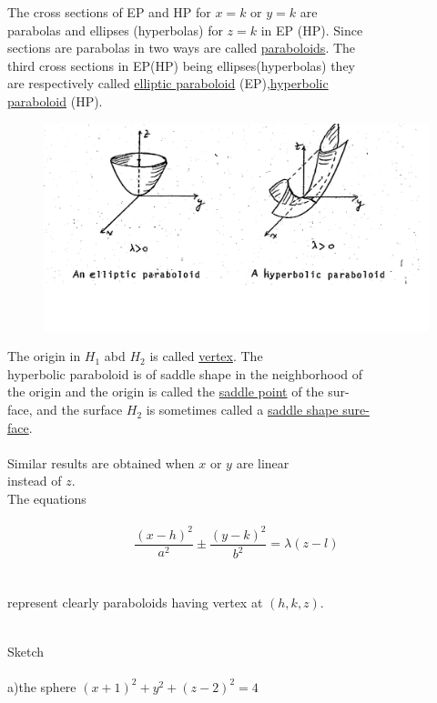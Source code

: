 \documentclass[a4paper,11pt]{amsbook}
\begin{document}
The cross sections of EP and HP for $x=k$ or $y=k$ are\\
parabolas and ellipses (hyperbolas) for $z=k$ in EP (HP). Since\\
sections are parabolas in two ways are called \underline{paraboloids}. The\\
third cross sections in EP(HP) being ellipses(hyperbolas) they\\
are respectively called \underline{elliptic paraboloid} (EP),\underline{hyperbolic} \\
\underline{paraboloid} (HP).
\\

\begin{figure}[h]
\includegraphics [keepaspectratio=true,scale=0.35]{images/p212-fig1}

\end{figure}

The origin in $H_{1}$ abd $H_{2}$ is called \underline{vertex}. The\\
hyperbolic paraboloid is of saddle shape in the neighborhood of\\
the origin and the origin is called the \underline{saddle point} of the sur-\\
face, and the surface $H_{2}$ is sometimes called a \underline{saddle shape sure-}\\
\underline{face}.\\
\\
Similar results are obtained when $x$ or $y$ are linear\\
instead of $z$.\\
The equations\\
\\
$$\frac{(x-h)^{2}}{a^{2}}\pm\frac{(y-k)^{2}}{b^{2}}=\lambda(z-l)$$\\
\\
represent clearly paraboloids having vertex at $(h,k,z)$.\\
\\
\begin{exmp}
Sketch\\
\\
a)the sphere $(x+1)^{2}+y^{2}+(z-2)^{2}=4$\\
\end{exmp}


	
\end{document}
